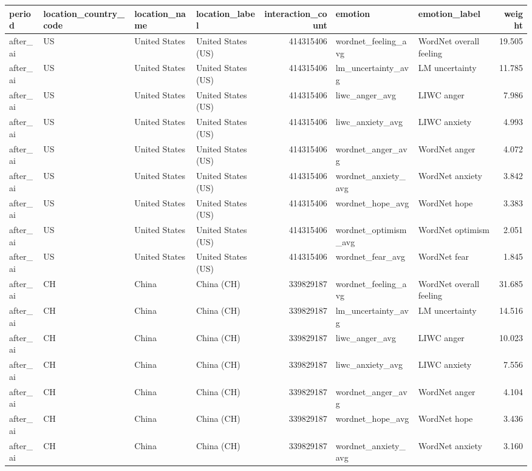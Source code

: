 \begin{tabular}{llllrllr}
\toprule
period & location\_country\_code & location\_name & location\_label & interaction\_count & emotion & emotion\_label & weight \\
\midrule
after\_ai & US & United States & United States (US) & 414315406 & wordnet\_feeling\_avg & WordNet overall feeling & 19.505 \\
after\_ai & US & United States & United States (US) & 414315406 & lm\_uncertainty\_avg & LM uncertainty & 11.785 \\
after\_ai & US & United States & United States (US) & 414315406 & liwc\_anger\_avg & LIWC anger & 7.986 \\
after\_ai & US & United States & United States (US) & 414315406 & liwc\_anxiety\_avg & LIWC anxiety & 4.993 \\
after\_ai & US & United States & United States (US) & 414315406 & wordnet\_anger\_avg & WordNet anger & 4.072 \\
after\_ai & US & United States & United States (US) & 414315406 & wordnet\_anxiety\_avg & WordNet anxiety & 3.842 \\
after\_ai & US & United States & United States (US) & 414315406 & wordnet\_hope\_avg & WordNet hope & 3.383 \\
after\_ai & US & United States & United States (US) & 414315406 & wordnet\_optimism\_avg & WordNet optimism & 2.051 \\
after\_ai & US & United States & United States (US) & 414315406 & wordnet\_fear\_avg & WordNet fear & 1.845 \\
after\_ai & CH & China & China (CH) & 339829187 & wordnet\_feeling\_avg & WordNet overall feeling & 31.685 \\
after\_ai & CH & China & China (CH) & 339829187 & lm\_uncertainty\_avg & LM uncertainty & 14.516 \\
after\_ai & CH & China & China (CH) & 339829187 & liwc\_anger\_avg & LIWC anger & 10.023 \\
after\_ai & CH & China & China (CH) & 339829187 & liwc\_anxiety\_avg & LIWC anxiety & 7.556 \\
after\_ai & CH & China & China (CH) & 339829187 & wordnet\_anger\_avg & WordNet anger & 4.104 \\
after\_ai & CH & China & China (CH) & 339829187 & wordnet\_hope\_avg & WordNet hope & 3.436 \\
after\_ai & CH & China & China (CH) & 339829187 & wordnet\_anxiety\_avg & WordNet anxiety & 3.160 \\

\end{tabular}
